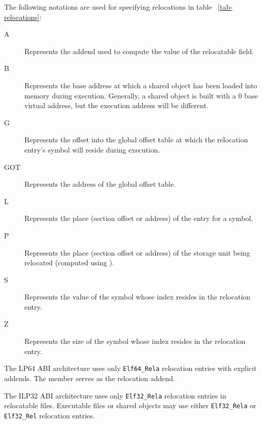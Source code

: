 The following notations are used for specifying relocations in table~
\ref{tab-relocations}:
\begin{description}
\item[A] Represents the addend used to compute the value of the
  relocatable field.
\item[B] Represents the base address at which a shared object has been
  loaded into memory during execution.  Generally, a shared object is
  built with a 0 base virtual address, but the execution address will
  be different.
\item[G] Represents the offset into the global offset table at which 
  the relocation entry's symbol will reside during execution.
\item[GOT] Represents the address of the global offset table.
\item[L] Represents the place (section offset or address) of the
   entry for a symbol.
\item[P] Represents the place (section offset or address) of the
  storage unit being relocated (computed using ).
\item[S] Represents the value of the symbol whose index resides in the
  relocation entry.
\item[Z] Represents the size of the symbol whose index resides in the
  relocation entry.
\end{description}

The \xARCH LP64 ABI architecture uses only \texttt{Elf64_Rela} relocation
entries with explicit addends.  The  member serves as
the relocation addend.

The \xARCH ILP32 ABI architecture uses only \texttt{Elf32_Rela} relocation
entries in relocatable files.  Executable
files or shared objects may use either \texttt{Elf32_Rela}
or \texttt{Elf32_Rel} relocation entries.

